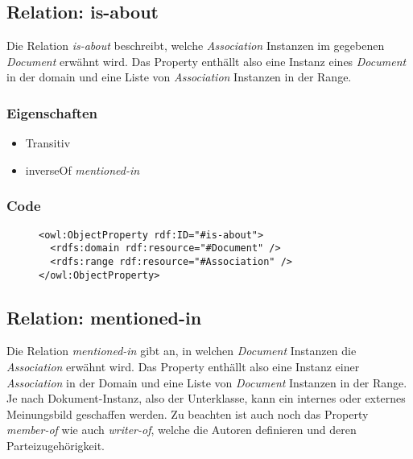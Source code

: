 \documentclass[
    11pt,
    latin1,
    a4paper,
    oneside
]{scrreprt}
\begin{document}
\subsection{Relation: is-about} \label{sec:rel_isabout}

Die Relation \emph{is-about} beschreibt, welche \emph{Association} Instanzen im gegebenen \emph{Document} erw\"ahnt wird. Das Property enth\"allt also eine Instanz eines \emph{Document} in der domain und eine Liste von \emph{Association} Instanzen in der Range.

\subsubsection{Eigenschaften} \label{sec:rel_isabout_settings}

\begin{itemize}
  \item Transitiv
  \item inverseOf \emph{mentioned-in}
\end{itemize}

\subsubsection{Code} \label{sec:rel_isabout_code}

\begin{figure}[h]
 \lstset{language=XML}
 \begin{lstlisting}[label=owl:isabout,caption={Die Relation \emph{is-about} gibt an, \"uber welche \emph{Association} ein Dokument ist}]
<owl:ObjectProperty rdf:ID="#is-about">
  <rdfs:domain rdf:resource="#Document" />
  <rdfs:range rdf:resource="#Association" />
</owl:ObjectProperty>
 \end{lstlisting}
\end{figure}


\subsection{Relation: mentioned-in} \label{sec:rel_mentionedin}

Die Relation \emph{mentioned-in} gibt an, in welchen \emph{Document} Instanzen die \emph{Association} erw\"ahnt wird. Das Property enth\"allt also eine Instanz einer \emph{Association} in der Domain und eine Liste von \emph{Document} Instanzen in der Range. Je nach Dokument-Instanz, also der Unterklasse, kann ein internes oder externes Meinungsbild geschaffen werden. Zu beachten ist auch noch das Property \emph{member-of} wie auch \emph{writer-of}, welche die Autoren definieren und deren Parteizugeh\"origkeit.
\end{document}
